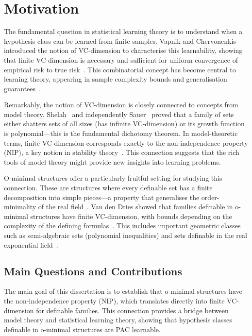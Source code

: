 \section{Motivation}

The fundamental question in statistical learning theory is to understand when a hypothesis class can be learned from finite samples. Vapnik and Chervonenkis introduced the notion of VC-dimension to characterise this learnability, showing that finite VC-dimension is necessary and sufficient for uniform convergence of empirical risk to true risk~\cite[Chap.~3]{DevroyeGyorfiLugosi1996}. This combinatorial concept has become central to learning theory, appearing in sample complexity bounds and generalisation guarantees~\cite[Chap.~2]{UnderstandinMachineLearning}.

Remarkably, the notion of VC-dimension is closely connected to concepts from model theory. Shelah~\cite{Shelah1972} and independently Sauer~\cite{Sauer1972} proved that a family of sets either shatters sets of all sizes (has infinite VC-dimension) or its growth function is polynomial—this is the fundamental dichotomy theorem. In model-theoretic terms, finite VC-dimension corresponds exactly to the non-independence property (NIP), a key notion in stability theory~\cite[Chap.~7]{TentZiegler2012}. This connection suggests that the rich tools of model theory might provide new insights into learning problems.

O-minimal structures offer a particularly fruitful setting for studying this connection. These are structures where every definable set has a finite decomposition into simple pieces—a property that generalises the order-minimality of the real field~\cite[Chap.~1]{vandenDries1998}. Van den Dries showed that families definable in o-minimal structures have finite VC-dimension, with bounds depending on the complexity of the defining formulas~\cite[Chap.~5]{vandenDries1998}. This includes important geometric classes such as semi-algebraic sets (polynomial inequalities) and sets definable in the real exponential field~\cite{DriesMiller1994}.

\subsection{Main Questions and Contributions}

The main goal of this dissertation is to establish that o-minimal structures have the non-independence property (NIP), which translates directly into finite VC-dimension for definable families. This connection provides a bridge between model theory and statistical learning theory, showing that hypothesis classes definable in o-minimal structures are PAC learnable.

